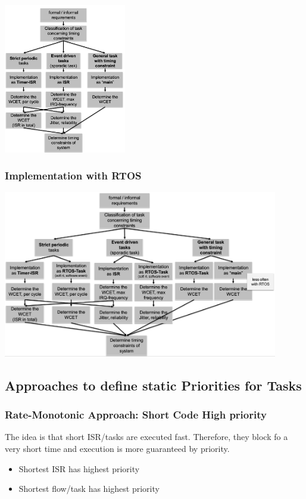 \includegraphics[width=0.4\textwidth]{images/DesignStrategy/task_implement_no_rtos.png}

\subsubsection{Implementation with RTOS}
\includegraphics[width=0.9\textwidth]{images/DesignStrategy/task_implement_rtos.png}

\subsection{Approaches to define static Priorities for Tasks}
\subsubsection{Rate-Monotonic Approach: Short Code High priority}
The idea is that short ISR/tasks are executed fast.
Therefore, they block fo a very short time and execution is more guaranteed by priority.
\begin{itemize}
	\item Shortest ISR has highest priority
	\item Shortest flow/task has highest priority
\end{itemize}

